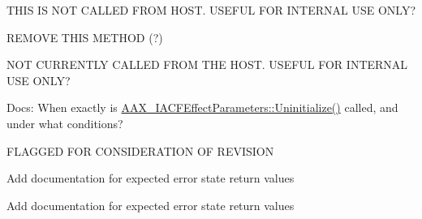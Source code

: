 \begin{DoxyRefList}
\item[Member \mbox{\hyperlink{a01669_a333b83bc6f37b0103ce0de65be02fede}{A\+A\+X\+\_\+\+I\+A\+C\+F\+Effect\+Parameters::Set\+Parameter\+Default\+Normalized\+Value}} (A\+A\+X\+\_\+\+C\+Param\+ID i\+Parameter\+ID, double i\+Value)=0]\label{a00785__todo000036}%
%
T\+H\+IS IS N\+OT C\+A\+L\+L\+ED F\+R\+OM H\+O\+ST. U\+S\+E\+F\+UL F\+OR I\+N\+T\+E\+R\+N\+AL U\+SE O\+N\+LY? 
\item[Member \mbox{\hyperlink{a01669_a6e28a427a0d7d0c8df69dd5eb88cff6c}{A\+A\+X\+\_\+\+I\+A\+C\+F\+Effect\+Parameters::Set\+Parameter\+Normalized\+Relative}} (A\+A\+X\+\_\+\+C\+Param\+ID i\+Parameter\+ID, double i\+Value)=0]\label{a00785__todo000039}%
%
R\+E\+M\+O\+VE T\+H\+IS M\+E\+T\+H\+OD (?)

\label{a00785__todo000040}%
%
N\+OT C\+U\+R\+R\+E\+N\+T\+LY C\+A\+L\+L\+ED F\+R\+OM T\+HE H\+O\+ST. U\+S\+E\+F\+UL F\+OR I\+N\+T\+E\+R\+N\+AL U\+SE O\+N\+LY? 
\item[Member \mbox{\hyperlink{a01669_a711969adc95624fb9ac8a3e3b2c23696}{A\+A\+X\+\_\+\+I\+A\+C\+F\+Effect\+Parameters::Uninitialize}} ()=0]\label{a00785__todo000035}%
%
Docs\+: When exactly is \mbox{\hyperlink{a01669_a711969adc95624fb9ac8a3e3b2c23696}{A\+A\+X\+\_\+\+I\+A\+C\+F\+Effect\+Parameters\+::\+Uninitialize()}} called, and under what conditions? 
\item[Member \mbox{\hyperlink{a01669_a685858711efb8634ce66c327f2865c71}{A\+A\+X\+\_\+\+I\+A\+C\+F\+Effect\+Parameters::Update\+Parameter\+Normalized\+Value}} (A\+A\+X\+\_\+\+C\+Param\+ID i\+Parameter\+ID, double i\+Value, A\+A\+X\+\_\+\+E\+Update\+Source i\+Source)=0]\label{a00785__todo000041}%
%
F\+L\+A\+G\+G\+ED F\+OR C\+O\+N\+S\+I\+D\+E\+R\+A\+T\+I\+ON OF R\+E\+V\+I\+S\+I\+ON 
\item[Class \mbox{\hyperlink{a01677}{A\+A\+X\+\_\+\+I\+A\+C\+F\+Effect\+Parameters\+\_\+\+V2}} ]\label{a00785__todo000032}%
%
Add documentation for expected error state return values 
\item[Class \mbox{\hyperlink{a01681}{A\+A\+X\+\_\+\+I\+A\+C\+F\+Effect\+Parameters\+\_\+\+V3}} ]\label{a00785__todo000033}%
%
Add documentation for expected error state return values 
\item[Class \mbox{\hyperlink{a01685}{A\+A\+X\+\_\+\+I\+A\+C\+F\+Effect\+Parameters\+\_\+\+V4}} ]\label{a00785__todo000034}%

\end{DoxyRefList}
